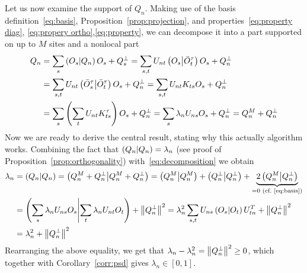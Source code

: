 Let us now examine the support of \(Q_n\). Making use of the basis definition~\eqref{eq:basis},
Proposition~\ref{prop:projection}, and properties~\eqref{eq:property diag},
\eqref{eq:propery ortho},\eqref{eq:property}, we can decompose it into a part supported
on up to \(M\) sites and a nonlocal part
\begin{align}
  Q_n &=  \sum_s \left(O_s \middle| Q_n\right)O_s + Q_s^{\perp} = \sum_{s,t} U_{n t}\left(O_{s} \middle| \bar{O}_{t}^{\tau}\right)
  O_{s}+Q_{n}^{\perp} \nonumber \\
  &= \sum_{s,t} U_{n t}\left(\bar{O}_{s}^{\tau} \middle| \bar{O}_{t}^{\tau}\right) O_{s}+Q_{n}^{\perp}
  = \sum_{s,t} U_{n t}K_{ts} O_{s}+Q_{n}^{\perp} \nonumber \\
  &= \sum_s  \left( \sum_t U_{n t}K_{ts}^{\tau}\right) O_{s}+Q_{n}^{\perp} = \sum_{s} 
  \lambda_{n} U_{n s} O_{s}+Q_{n}^{\perp} = Q_{n}^{M}+Q_{n}^{\perp}
  \label{eq:decomposition}
\end{align}
Now we are ready to derive the central result, stating why this actually algorithm works. 
Combining the fact that \(\left(Q_n \middle| Q_n\right) = \lambda_n \) (see proof of 
Proposition~\ref{prop:orthogonality}) with~\eqref{eq:decomposition} we obtain
\begin{align}
  \lambda_n &= \left(Q_n \middle| Q_n\right) = \left(Q_n^M + Q_n^{\perp} \middle| Q_n^M + Q_n^{\perp}\right) = \left(Q_n^M \middle| Q_n^M\right) +
   \left(Q_n^{\perp} \middle| Q_n^{\perp}\right) + \underbrace{2 \left(Q_n^M \middle| Q_n^{\perp}\right)}_{=0 \text{ (cf.~\eqref{eq:basis})}} \nonumber \\
   &= \left(\sum_s \lambda_n U_{ns} O_s \middle| \sum_t \lambda_n U_{nt} O_t\right) + \norm{Q_n^{\perp}}^2 =
  \lambda_n^2 \sum_{s,t} U_{ns} \left(O_s \middle| O_t\right) U_{tn}^{T} + \norm{Q_n^{\perp}}^2  \nonumber \\
  &=\lambda_n^2 + \norm{Q_n^{\perp}}^2
\end{align}
Rearranging the above equality, we get that \(\lambda_n - \lambda_n^2 = \norm{Q_n^{\perp}}^2 \geq 0\), which together with
Corollary~\ref{corr:psd} gives \(\lambda_n \in \left[0,1\right]\). 

